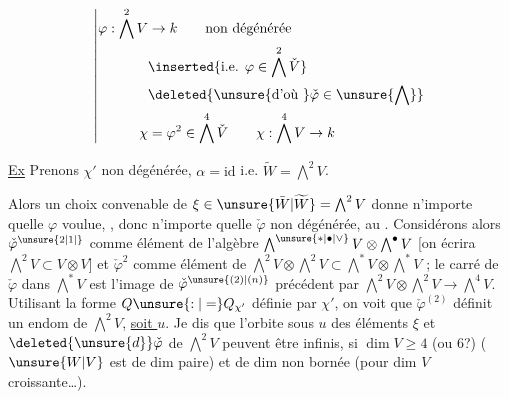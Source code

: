 \[
\left|\begin{aligned}
\varphi:\bigwedge^2 V&\to k\qquad\text{non dégénérée}\\
&\inserted{\text{i.e. }\varphi\in\bigwedge^2\check V}\\
&\deleted{\unsure{\text{d'où }}\check\varphi\in\unsure{\bigwedge}}\\
\chi&=\varphi^2\in\bigwedge^4\check V\qquad \chi:\bigwedge^4 V\to k
\end{aligned}\right.
\]

\uline{Ex} Prenons $\chi'$ non dégénérée,  $\alpha=\mathrm{id}$ i.e. $\widetilde W=\bigwedge^2 V$.

Alors un choix convenable de $\xi\in\unsure{\bar W|\widetilde W}=\bigwedge^2 V$ donne n'importe quelle $\varphi$ voulue, , donc n'importe quelle $\check\varphi$  non dégénérée, au . Considérons alors $\check\varphi^{\unsure{2|1|{}}}$ comme élément de  l'algèbre $\bigwedge^{\unsure{*|\bullet|\vee}}V\otimes\bigwedge^\bullet V$ [on écrira $\bigwedge^2 V\subset V\otimes V$] et $\check\varphi^{2}$ comme élément de $\bigwedge^2 V\otimes\bigwedge^2 V\subset\bigwedge^*V\otimes\bigwedge^*V$ ; le carré de $\check\varphi$ dans $\bigwedge^*V$  est l'image de $\check\varphi^{\unsure{(2)|(n)}}$ précédent par $\bigwedge^2 V\otimes\bigwedge^2 V\longrightarrow\bigwedge^4 V$. Utilisant la forme $Q\unsure{:|=}Q_{\chi'}$ définie par $\chi'$, on voit que $\check\varphi^{(2)}$ définit un endom de $\bigwedge^2 V$, \uline{soit $u$}. Je dis que l'orbite sous $u$ des éléments $\xi$ et $\deleted{\unsure{d}}\check\varphi$ de $\bigwedge^2 V$ peuvent être infinis, si $\dim V\geq4$ (ou 6?) ($\unsure{W|V}$ est de dim paire)  et  de dim non bornée (pour dim $V$ croissante\ldots).
